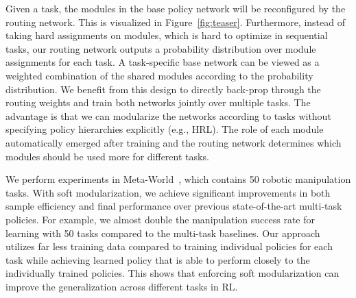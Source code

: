 \documentclass{article}
\begin{document}
Given a task, the modules in the base policy network will be reconfigured by the routing network. This is visualized in Figure~\ref{fig:teaser}. Furthermore, instead of taking hard assignments on modules, which is hard to optimize in sequential tasks, our routing network outputs a probability distribution over module assignments for each task. A task-specific base network can be viewed as a weighted combination of the shared modules according to the probability distribution. We benefit from this design to directly back-prop through the routing weights and train both networks jointly over multiple tasks. The advantage is that we can modularize the networks according to tasks without specifying policy hierarchies explicitly (e.g., HRL). The role of each module automatically emerged after training and the routing network 
determines which modules should be used more for different tasks.

We perform experiments in Meta-World~\cite{yu2019meta}, which contains 50 robotic manipulation tasks. With soft modularization, we achieve significant improvements in both sample efficiency and final performance over previous state-of-the-art multi-task policies. For example, we almost double the manipulation success rate for learning with 50 tasks compared to the multi-task baselines. Our approach utilizes far less training data compared to training individual policies for each task while achieving learned policy that is able to perform closely to the individually trained policies. This shows that enforcing soft modularization can improve the generalization across different tasks in RL. 
 
\vspace{-0.1in}
\end{document}
